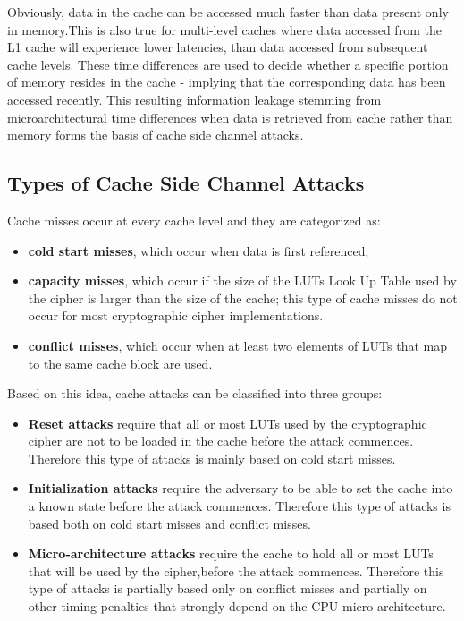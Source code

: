 \documentclass[twocolumn]{IEEEtran}
\begin{document}
Obviously, data in the cache can be accessed much faster than data present only in memory.This is also true for multi-level caches where data accessed from the L1 cache will experience lower latencies, than data accessed from subsequent cache levels. These time differences are used to decide whether a specific portion of memory resides in the cache - implying that the corresponding data has been accessed recently. This resulting information leakage stemming from microarchitectural time differences when data is retrieved from cache rather than memory forms the basis of cache side channel attacks.

\subsection { Types of Cache Side Channel Attacks }

Cache misses occur at every cache level and they are categorized as:

\begin {itemize}
\item \textbf{cold start misses}, which occur when data is first referenced;
\item \textbf{capacity misses}, which occur if the size of the LUTs Look Up Table used by the cipher is larger than the size of the cache; this type of cache misses do not occur for most cryptographic cipher implementations.
\item \textbf{conflict misses}, which occur when at least two elements of LUTs that map to the same cache block are used.
\end {itemize}

Based on this idea, cache attacks can be classified into three groups:

\begin {itemize}

\item \textbf{Reset attacks} require that all or most LUTs used by the cryptographic cipher are not to be loaded in the cache before the attack commences. Therefore this type of attacks is mainly based on cold start misses.

\item \textbf{Initialization attacks} require the adversary to be able to set the cache into a known state before the attack commences. Therefore this type of attacks is based both on cold start misses and conflict misses.

\item \textbf{Micro-architecture attacks} require the cache to hold all or most LUTs that will be used by the cipher,before the attack commences. Therefore this type of attacks is partially based only on conflict misses and partially on other timing penalties that
strongly depend on the CPU micro-architecture. 

\end {itemize}
\end{document}
